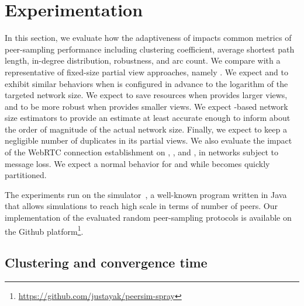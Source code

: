 \newcommand\SCALE{1}

\section{Experimentation}
\label{sec:experimentation}


In this section, we evaluate how the adaptiveness of \SPRAY impacts common
metrics of peer-sampling performance including clustering coefficient, average
shortest path length, in-degree distribution, robustness, and arc count. We
compare \SPRAY with a representative of fixed-size partial view approaches,
namely \CYCLON. We expect \SPRAY and \CYCLON to exhibit similar behaviors when
\CYCLON is configured in advance to the logarithm of the targeted network
size. We expect \SPRAY to save resources when \CYCLON provides larger views, and
to be more robust when \CYCLON provides smaller views. We expect \SPRAY-based
network size estimators to provide an estimate at least accurate enough to
inform about the order of magnitude of the actual network size.  Finally, we
expect \SPRAY to keep a negligible number of duplicates in its partial views. We
also evaluate the impact of the WebRTC connection establishment on \CYCLON,
\SCAMP, and \SPRAY, in networks subject to message loss.  We expect a normal
behavior for \CYCLON and \SPRAY while \SCAMP becomes quickly partitioned.

The experiments run on the \PEERSIM simulator~\cite{montresor2009peersim}, a
well-known program written in Java that allows simulations to reach high scale
in terms of number of peers. Our implementation of the evaluated random
peer-sampling protocols is available on the Github
platform\footnote{\url{https://github.com/justayak/peersim-spray}}.


\subsection{Clustering and convergence time}

